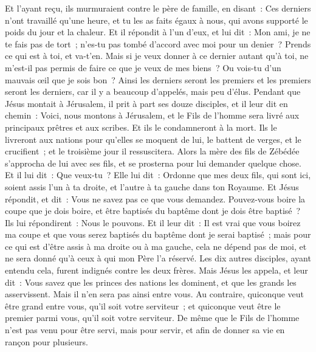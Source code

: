 \begin{multicols}{2}
Et l'ayant reçu, ils murmuraient contre le père de famille,
en disant~: Ces derniers n'ont travaillé qu'une heure, et tu les as faits égaux à nous, qui avons supporté le poids du jour et la chaleur.
Et il répondit à l'un d'eux, et lui dit~: Mon ami, je ne te fais pas de tort~; n'es-tu pas tombé d'accord avec moi pour un denier~?
Prends ce qui est à toi, et va-t'en. Mais si je veux donner à ce dernier autant qu'à toi,
ne m'est-il pas permis de faire ce que je veux de mes biens~? Ou vois-tu d'un mauvais œil que je sois bon~?
Ainsi les derniers seront les premiers et les premiers seront les derniers, car il y a beaucoup d'appelés, mais peu d'élus.
Pendant que Jésus montait à Jérusalem, il prit à part ses douze disciples, et il leur dit en chemin~:
Voici, nous montons à Jérusalem, et le Fils de l'homme sera livré aux principaux prêtres et aux scribes. Et ils le condamneront à la mort.
Ils le livreront aux nations pour qu'elles se moquent de lui, le battent de verges, et le crucifient~; et le troisième jour il ressuscitera.
Alors la mère des fils de Zébédée s'approcha de lui avec ses fils, et se prosterna pour lui demander quelque chose.
Et il lui dit~: Que veux-tu~? Elle lui dit~: Ordonne que mes deux fils, qui sont ici, soient assis l'un à ta droite, et l'autre à ta gauche dans ton Royaume.
Et Jésus répondit, et dit~: Vous ne savez pas ce que vous demandez. Pouvez-vous boire la coupe que je dois boire, et être baptisés du baptême dont je dois être baptisé~? Ils lui répondirent~: Nous le pouvons.
Et il leur dit~: Il est vrai que vous boirez ma coupe et que vous serez baptisés du baptême dont je serai baptisé~; mais pour ce qui est d'être assis à ma droite ou à ma gauche, cela ne dépend pas de moi, et ne sera donné qu'à ceux à qui mon Père l'a réservé.
Les dix autres disciples, ayant entendu cela, furent indignés contre les deux frères.
Mais Jésus les appela, et leur dit~: Vous savez que les princes des nations les dominent, et que les grands les asservissent.
Mais il n'en sera pas ainsi entre vous. Au contraire, quiconque veut être grand entre vous, qu'il soit votre serviteur~;
et quiconque veut être le premier parmi vous, qu'il soit votre serviteur.
De même que le Fils de l'homme n'est pas venu pour être servi, mais pour servir, et afin de donner sa vie en rançon pour plusieurs.

\end{multicols}
